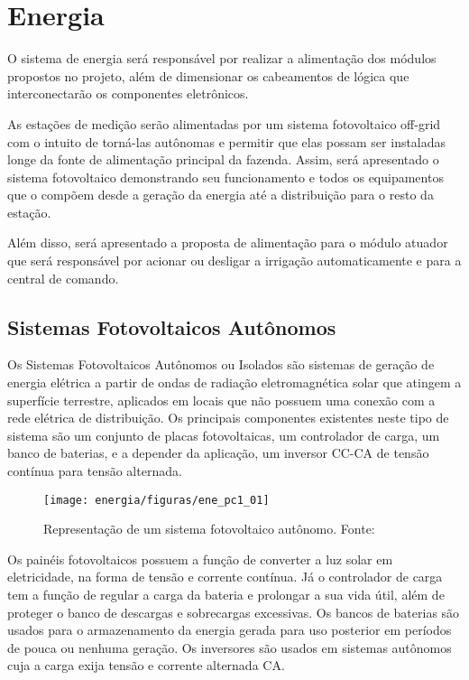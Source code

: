\chapter[Energia]{Energia}

O sistema de energia será responsável por realizar a alimentação dos módulos propostos no projeto, além de dimensionar os cabeamentos de lógica que interconectarão os componentes eletrônicos.

As estações de medição serão alimentadas por um sistema fotovoltaico off-grid com o intuito de torná-las autônomas e permitir que elas possam ser instaladas longe da fonte de alimentação principal da fazenda. Assim, será apresentado o sistema fotovoltaico demonstrando seu funcionamento e todos os equipamentos que o compõem desde a geração da energia até a distribuição para o resto da estação.

Além disso, será apresentado a proposta de alimentação para o módulo atuador que será responsável por acionar ou desligar a irrigação automaticamente e para a central de comando.  

\section{Sistemas Fotovoltaicos Autônomos}

	Os Sistemas Fotovoltaicos Autônomos ou Isolados são sistemas de geração de energia elétrica a partir de ondas de radiação eletromagnética solar que atingem a superfície terrestre, aplicados em locais que não possuem uma conexão com a rede elétrica de distribuição. Os principais componentes existentes neste tipo de sistema são um conjunto de placas fotovoltaicas, um controlador de carga, um banco de baterias, e a depender da aplicação, um inversor CC-CA de tensão contínua para tensão alternada. 

\begin{figure}[H]
		\centering
		\texttt{[image: energia/figuras/ene\_pc1\_01]}
		\caption{Representação de um sistema fotovoltaico autônomo. Fonte:\cite{Antonio}}
		\label{ene_pc1_01}
	\end{figure}	 		

	Os painéis fotovoltaicos possuem a função de converter a luz solar em eletricidade, na forma de tensão e corrente contínua. Já o controlador de carga tem a função de regular a carga da bateria e prolongar a sua vida útil, além de proteger o banco de descargas e sobrecargas excessivas. Os bancos de baterias são usados para o armazenamento da energia gerada para uso posterior em períodos de pouca ou nenhuma geração. Os inversores são usados em sistemas autônomos cuja a carga exija tensão e corrente alternada CA.
		
